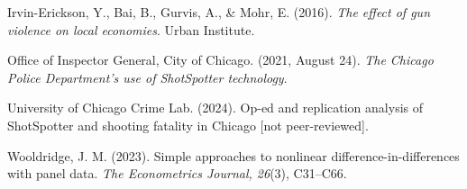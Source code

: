 \documentclass[12pt]{article}
\begin{document}
\begin{flushleft}
Irvin-Erickson, Y., Bai, B., Gurvis, A., \& Mohr, E. (2016). \emph{The effect of gun
violence on local economies}. Urban Institute.

Office of Inspector General, City of Chicago. (2021, August 24). \emph{The Chicago Police
Department's use of ShotSpotter technology}.

University of Chicago Crime Lab. (2024). Op-ed and replication analysis of ShotSpotter and
shooting fatality in Chicago [not peer-reviewed].

Wooldridge, J. M. (2023). Simple approaches to nonlinear difference-in-differences with
panel data. \emph{The Econometrics Journal, 26}(3), C31--C66.

\end{flushleft}
\end{document}
